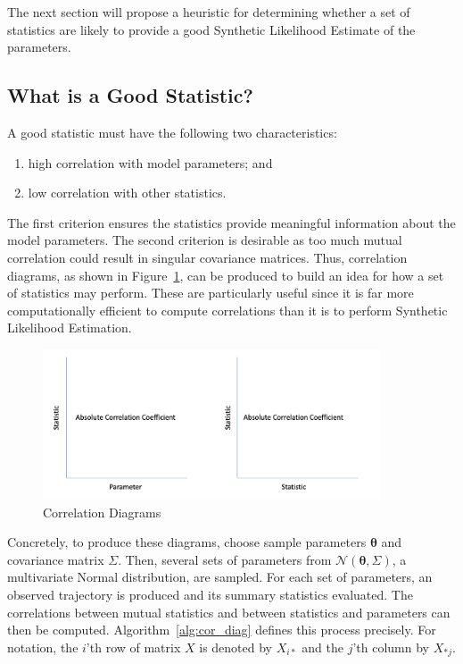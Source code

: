 The next section will propose a heuristic for determining whether a set of statistics are likely to provide a good Synthetic Likelihood Estimate of the parameters.

\subsection{What is a Good Statistic?}
\label{subsec:corr_diag}

A good statistic must have the following two characteristics:

\begin{enumerate}
    \item high correlation with model parameters; and
    \item low correlation with other statistics.
\end{enumerate}

The first criterion ensures the statistics provide meaningful information about the model parameters. The second criterion is desirable as too much mutual correlation could result in singular covariance matrices. Thus, correlation diagrams, as shown in Figure~\ref{fig:corr_diags}, can be produced to build an idea for how a set of statistics may perform. These are particularly useful since it is far more computationally efficient to compute correlations than it is to perform Synthetic Likelihood Estimation.

\begin{figure}[H]
    \centering
    \includegraphics[width=10cm]{images/sl/corr_diags.png}
    \caption{Correlation Diagrams}
    \label{fig:corr_diags}
\end{figure}

Concretely, to produce these diagrams, choose sample parameters $\pmb{\theta}$ and covariance matrix $\Sigma$. Then, several sets of parameters from $\mathcal{N}(\pmb{\theta}, \Sigma)$, a multivariate Normal distribution, are sampled. For each set of parameters, an observed trajectory is produced and its summary statistics evaluated. The correlations between mutual statistics and between statistics and parameters can then be computed. Algorithm~\ref{alg:cor_diag} defines this process precisely. For notation, the $i$'th row of matrix $X$ is denoted by $X_{i*}$ and the $j$'th column by $X_{*j}$.

